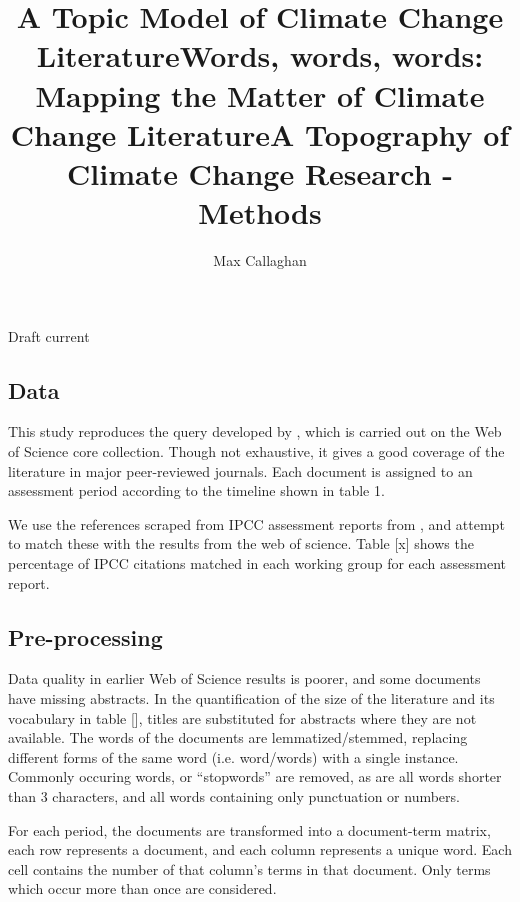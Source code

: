 \documentclass{article}
\makeatletter
\renewcommand{\maketitle}{\bgroup\setlength{\parindent}{0pt}
	\begin{flushleft}
		
		{\huge\textbf{\@title}}
		
		\bigskip
		
		{\large\textbf{\@author}}
		
		\bigskip
		
		{\large{Draft current \@date}}
		
	\end{flushleft}\egroup
}
\makeatother
\begin{document}
	\title{A Topic Model of Climate Change Literature}
	\title{Words, words, words: Mapping the Matter of Climate Change Literature}
	\title{A Topography of Climate Change Research - Methods}
	\author[1,2]{Max Callaghan}
	
	\maketitle
	\begin{linenumbers}
		
	\subsection*{Data}
	
	This study reproduces the query developed by \citep{Grieneisen2011}, which is carried out on the Web of Science core collection. Though not exhaustive, it gives a good coverage of the literature in major peer-reviewed journals.	Each document is assigned to an assessment period according to the timeline shown in table 1.
	
	We use the references scraped from IPCC assessment reports from \citep{Minx2017l}, and attempt to match these with the results from the web of science. Table [x] shows the percentage of IPCC citations matched in each working group for each assessment report.
		
	\subsection*{Pre-processing}
	
	Data quality in earlier Web of Science results is poorer, and some documents have missing abstracts. In the quantification of the size of the literature and its vocabulary in table [], titles are substituted for abstracts where they are not available.  The words of the documents are lemmatized/stemmed, replacing different forms of the same word (i.e. word/words) with a single instance. Commonly occuring words, or ``stopwords'' are removed, as are all words shorter than 3 characters, and all words containing only punctuation or numbers.
	
	For each period, the documents are transformed into a document-term matrix, each row represents a document, and each column represents a unique word.  Each cell contains the number of that column's terms in that document. Only terms which occur more than once are considered.
	

\end{linenumbers}
\end{document}
